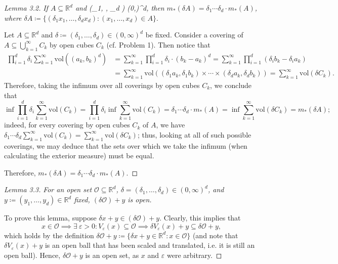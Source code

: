 \begin{proof}[Lemma 3.2]
	\emph{If \( A \subseteq \mathbb{R}^{d}  \) and \delta \coloneqq(\delta_1, \hdots , \delta_d ) \in (0,\infty)^{d}\), then \(m_*(\delta A) = \delta_1 \cdots \delta _d \cdot m_*(A)  \), where \( \delta A \coloneqq \{ (\delta_1 x_1, \hdots , \delta_dx_d ) : (x_1, \hdots , x_d) \in A\}  \)}. 

Let \( A \subseteq \mathbb{R}^{d}  \) and \( \delta  \coloneqq(\delta_1, \hdots , \delta_d ) \in (0,\infty)^{d} \) be fixed. Consider a covering of \( A \subseteq \bigcup_{k=1}^{\infty} C_k \) by open cubes \( C_k \) (cf. Problem 1). Then notice that
\begin{align*}
	  \prod_{i=1}^{d} \delta_i \sum_{k=1}^{\infty}\mbox{vol}((a_k, b_k)^{d} ) &=  \sum_{k=1}^{\infty}\prod_{i=1} ^{d}\delta _i \cdot (b_k - a_k)^{d} = \sum_{k=1}^{\infty} \prod_{i=1} ^{d} (\delta_i b_k - \delta_i a_k)  \\	
								      &= \sum_{k=1}^{\infty} \mbox{vol}((\delta_1a_k, \delta_1 b_k  ) \times \cdots \times (\delta_d a_k, \delta_d b_k ) )= \sum_{k=1}^{\infty}\mbox{vol}(\delta C_k) .
\end{align*}
Therefore, taking the infimum over all coverings by open cubes \( C_k \), we conclude that \[\inf \prod_{i=1}^{d} \delta_i \sum_{k=1}^{\infty}\mbox{vol}(C_k) = \prod_{i=1}^{d} \delta_i \inf \sum_{k=1}^{\infty}\mbox{vol}(C_k) = \delta_1\cdots \delta_d \cdot m_*(A) = \inf \sum_{k=1}^{\infty}\mbox{vol}(\delta C_k) = m_*(\delta A); \] indeed, for every covering by open cubes \( C_k \) of \( A \), we have \( \delta_1\cdots \delta_d \sum_{k=1}^{\infty}\mbox{vol}(C_k) = \sum_{k=1}^{\infty}\mbox{vol}(\delta C_k)  \); thus, looking at all of such possible coverings, we may deduce that the sets over which we take the infimum (when calculating the exterior measure) must be equal.

Therefore, \( m_*(\delta A) = \delta_1\cdots \delta_d \cdot m_*(A).  \)   
\end{proof}
\begin{proof}[Lemma 3.3]
\emph{For an open set \( \mathcal{O}  \subseteq \mathbb{R}^{d} \), \( \delta = (\delta_1, \hdots , \delta_d) \in (0, \infty)^{d}  \), and \( y \coloneqq (y_1, \hdots , y_d) \in \mathbb{R}^{d}  \) fixed, \( (\delta \mathcal{O} ) + y \) is open.}

To prove this lemma, suppose \( \delta x + y \in (\delta \mathcal{O} ) + y. \) Clearly, this implies that \[ x \in \mathcal{O} \implies \exists \ \varepsilon > 0 : V_\varepsilon (x) \subseteq \mathcal{O} \implies \delta V_\varepsilon (x) + y \subseteq \delta \mathcal{O} + y, \] which holds by the definition \(\delta \mathcal{O} + y \coloneqq \{ \delta x + y \in \mathbb{R}^{d} : x \in \mathcal{O}  \}\) (and note that \( \delta V_\varepsilon (x) + y \) is an open ball that has been scaled and translated, i.e. it is still an open ball). Hence, \( \delta \mathcal{O} + y \) is an open set, as \( x \) and \( \varepsilon  \) were arbitrary.
\end{proof}

